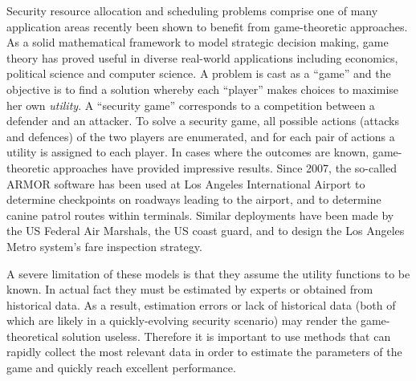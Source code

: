 Security resource allocation and scheduling problems comprise one of many application areas recently been shown to benefit from game-theoretic approaches. As a solid mathematical framework to model strategic decision making, game theory has proved useful in  diverse real-world applications including economics, political science and computer science. A problem is cast as a ``game'' and the objective is to find a solution whereby each ``player'' makes choices to maximise her own \textit{utility}. %
 A ``security game'' corresponds to a competition between a defender and an attacker. To solve a security game, all possible actions (attacks and defences) of the two players are enumerated, and for each pair of actions a utility is assigned to each player. In cases where the outcomes are known, game-theoretic approaches have provided impressive results. Since 2007, the so-called ARMOR software \cite{pita2008deployed} has been used at Los Angeles International Airport to  determine checkpoints on roadways leading to the airport, and to determine canine patrol routes within terminals. Similar deployments have been made by the US Federal Air Marshals, the US coast guard, and to design the Los Angeles Metro system's fare inspection strategy\cite{tsai2009iris,shieh2012protect,yin2012trusts}. 


A severe limitation of these models is that they assume the utility functions to be known. In actual fact they must be estimated by experts or obtained from historical data. As a result, estimation errors or lack of historical data (both of which are likely in a quickly-evolving security scenario) may render the game-theoretical solution useless. 
Therefore it is important to use methods that can rapidly collect the most relevant data  in order to estimate the parameters of the game and quickly reach excellent performance.


